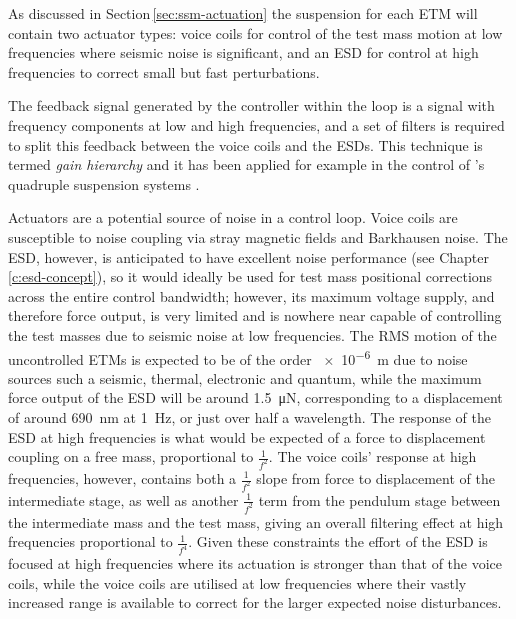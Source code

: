 As discussed in Section\,\ref{sec:ssm-actuation} the suspension for each \gls{ETM} will contain two actuator types: voice coils for control of the test mass motion at low frequencies where seismic noise is significant, and an \gls{ESD} for control at high frequencies to correct small but fast perturbations.

The feedback signal generated by the controller within the loop is a signal with frequency components at low and high frequencies, and a set of filters is required to split this feedback between the voice coils and the \glspl{ESD}. This technique is termed \emph{gain hierarchy} and it has been applied for example in the control of \ALIGO{}'s quadruple suspension systems \cite{Shapiro2012}.

Actuators are a potential source of noise in a control loop. Voice coils are susceptible to noise coupling via stray magnetic fields and Barkhausen noise. The \gls{ESD}, however, is anticipated to have excellent noise performance (see Chapter\,\ref{c:esd-concept}), so it would ideally be used for test mass positional corrections across the entire control bandwidth; however, its maximum voltage supply, and therefore force output, is very limited and is nowhere near capable of controlling the test masses due to seismic noise at low frequencies. The \gls{RMS} motion of the uncontrolled \glspl{ETM} is expected to be of the order \SI{e-6}{\meter} due to noise sources such a seismic, thermal, electronic and quantum, while the maximum force output of the \gls{ESD} will be around \SI{1.5}{\micro\newton}, corresponding to a displacement of around \SI{690}{\nano\meter} at \SI{1}{\hertz}, or just over half a wavelength. The response of the \gls{ESD} at high frequencies is what would be expected of a force to displacement coupling on a free mass, proportional to $\frac{1}{f^2}$. The voice coils' response at high frequencies, however, contains both a $\frac{1}{f^2}$ slope from force to displacement of the intermediate stage, as well as another $\frac{1}{f^2}$ term from the pendulum stage between the intermediate mass and the test mass, giving an overall filtering effect at high frequencies proportional to $\frac{1}{f^4}$. Given these constraints the effort of the \gls{ESD} is focused at high frequencies where its actuation is stronger than that of the voice coils, while the voice coils are utilised at low frequencies where their vastly increased range is available to correct for the larger expected noise disturbances.

